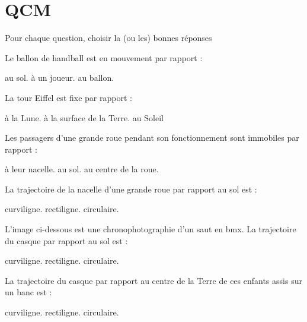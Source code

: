\section{QCM}

Pour chaque question, choisir la (ou les) bonnes réponses

\begin{questions}
	
	\question Le ballon de handball est en mouvement par rapport :
	\begin{oneparcheckboxes}
		\correctchoice au sol.
		\correctchoice à un joueur.
		\choice au ballon.
	\end{oneparcheckboxes}

	\question La tour Eiffel est fixe par rapport :
	\begin{oneparcheckboxes}
		\choice à la Lune.
		\correctchoice à la surface de la Terre.
		\choice au Soleil
	\end{oneparcheckboxes}

	\question Les passagers d'une grande roue pendant son fonctionnement sont immobiles par rapport :
	\begin{oneparcheckboxes}
		\correctchoice à leur nacelle.
		\choice au sol.
		\choice au centre de la roue.
	\end{oneparcheckboxes}

	\question La trajectoire de la nacelle d'une grande roue par rapport au sol est :
	\begin{oneparcheckboxes}
		\choice curviligne.
		\choice rectiligne.
		\correctchoice circulaire.
	\end{oneparcheckboxes}

	\question L'image ci-dessous est une chronophotographie d'un saut en bmx. La trajectoire du casque par rapport au sol est :
	\begin{oneparcheckboxes}
		\correctchoice curviligne.
		\choice rectiligne.
		\choice circulaire.
	\end{oneparcheckboxes}

	\question La trajectoire du casque par rapport au centre de la Terre de ces enfants assis sur un banc est :
	\begin{oneparcheckboxes}
		\choice curviligne.
		\choice rectiligne.
		\correctchoice circulaire.
	\end{oneparcheckboxes}
\end{questions}